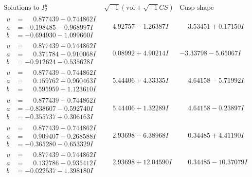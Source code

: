 \documentclass[1p]{elsarticle_modified}
\theoremstyle{definition}
\newcommand{\I}{\sqrt{-1}}
\begin{document}
$$\begin{array}{c|c|c}  
\text{Solutions to }I^u_{2}& \I (\text{vol} + \sqrt{-1}CS) & \text{Cusp shape}\\
 \hline 
\begin{aligned}
u &= \phantom{-}0.877439 + 0.744862 I \\
a &= -0.198485 - 0.968997 I \\
b &= -0.694930 - 1.099660 I\end{aligned}
 & \phantom{-}4.92757 - 1.26387 I & \phantom{-}3.53451 + 0.17150 I \\ \hline\begin{aligned}
u &= \phantom{-}0.877439 + 0.744862 I \\
a &= \phantom{-}0.371784 - 0.910068 I \\
b &= -0.912624 - 0.535628 I\end{aligned}
 & \phantom{-}0.08992 + 4.90214 I & -3.33798 - 5.65067 I \\ \hline\begin{aligned}
u &= \phantom{-}0.877439 + 0.744862 I \\
a &= \phantom{-}0.159762 + 0.960463 I \\
b &= \phantom{-}0.595959 + 1.123610 I\end{aligned}
 & \phantom{-}5.44406 + 4.33335 I & \phantom{-}4.64158 - 5.71992 I \\ \hline\begin{aligned}
u &= \phantom{-}0.877439 + 0.744862 I \\
a &= -0.838607 - 0.592740 I \\
b &= -0.355737 + 0.306163 I\end{aligned}
 & \phantom{-}5.44406 + 1.32289 I & \phantom{-}4.64158 - 0.23897 I \\ \hline\begin{aligned}
u &= \phantom{-}0.877439 + 0.744862 I \\
a &= \phantom{-}0.909407 - 0.268588 I \\
b &= -0.365280 - 0.653329 I\end{aligned}
 & \phantom{-}2.93698 - 6.38968 I & \phantom{-}0.34485 + 4.41190 I \\ \hline\begin{aligned}
u &= \phantom{-}0.877439 + 0.744862 I \\
a &= \phantom{-}0.132786 - 0.935412 I \\
b &= -0.022537 - 1.398180 I\end{aligned}
 & \phantom{-}2.93698 + 12.04590 I & \phantom{-}0.34485 - 10.37079 I \\ \hline\begin{aligned}

\end{aligned}
\end{array}$$
\end{document}
